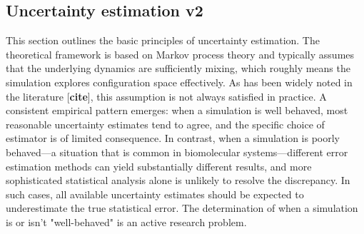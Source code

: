 \documentclass[9pt,bestpractices]{livecoms}
\begin{document}



\subsection{Uncertainty estimation v2}


This section outlines the basic principles of uncertainty estimation. The theoretical framework is based on Markov process theory and typically assumes that the underlying dynamics are sufficiently mixing, which roughly means the simulation explores configuration space effectively. As has been widely noted in the literature [\textbf{cite}], this assumption is not always satisfied in practice. A consistent empirical pattern emerges: when a simulation is well behaved, most reasonable uncertainty estimates tend to agree, and the specific choice of estimator is of limited consequence. In contrast, when a simulation is poorly behaved—a situation that is common in biomolecular systems—different error estimation methods can yield substantially different results, and more sophisticated statistical analysis alone is unlikely to resolve the discrepancy. In such cases, all available uncertainty estimates should be expected to underestimate the true statistical error. The determination of when a simulation is or isn't "well-behaved" is an active research problem. %
\end{document}
